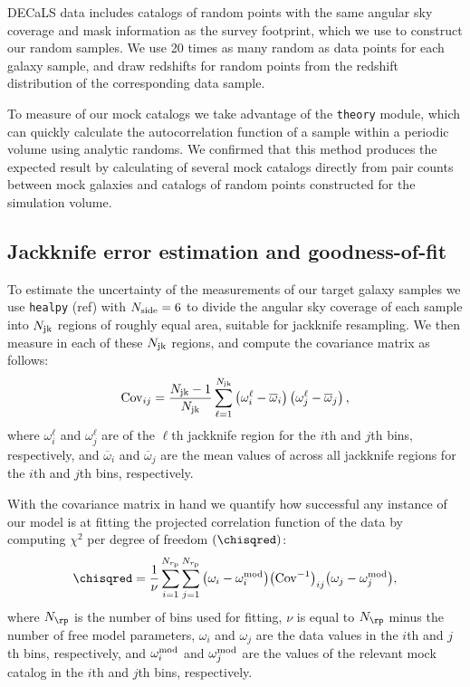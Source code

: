 \documentclass[twocolumn,apj,iop,tighten]{emulateapj2}
\begin{document}
DECaLS data includes catalogs of random points with the same angular sky coverage and mask information as the survey footprint, which we use to construct our random samples. We use 20 times as many random as data points for each galaxy sample, and draw redshifts for random points from the redshift distribution of the corresponding data sample.

To measure \wprp of our mock catalogs we take advantage of the \corrfunc \texttt{theory} module, which can quickly calculate the autocorrelation function of a sample within a periodic volume using analytic randoms. We confirmed that this method produces the expected result by calculating \wprp of several mock catalogs directly from pair counts between mock galaxies and catalogs of random points constructed for the simulation volume.


\subsection{Jackknife error estimation and goodness-of-fit}\label{subsec:error}

To estimate the uncertainty of the \wprp measurements of our target galaxy samples we use \texttt{healpy} (ref) with $N_{\rm side}=6$ to divide the angular sky coverage of each sample into $N_{\rm jk}$ regions of roughly equal area, suitable for jackknife resampling. We then measure \wprp in each of these $N_{\rm jk}$ regions, and compute the covariance matrix as follows:
\begin{equation}\label{eq:cov}
{\rm Cov}_{ij} = \frac{N_{\rm jk}-1}{N_{\rm jk}}
\sum^{N_{\rm jk}}_{\ell=1}\left(\omega^\ell_i-\overline{\omega}_i\right) \left(\omega^\ell_j-\overline{\omega}_j\right),
\end{equation}
%
\noindent where $\omega^\ell_i$ and $\omega^\ell_j$ are \wprp of the $\ell$th jackknife region for the $i$th and $j$th \rp bins, respectively, and $\overline{\omega}_i$ and $\overline{\omega}_j$ are the mean values of \wprp across all jackknife regions for the $i$th and $j$th \rp bins, respectively.

With the covariance matrix in hand we quantify how successful any instance of our model is at fitting the projected correlation function of the data by computing $\chi^2$ per degree of freedom $(\chisqred)$:
%
\begin{equation}\label{eq:chisq}
\chisqred=\frac{1}{\nu}\sum_{i=1}^{N_{r_{\rm p}}}
\sum_{j=1}^{N_{r_{\rm p}}}\left(\omega_i-\omega^{\rm mod}_i\right)
\!\left({\rm Cov}^{-1}\right)_{ij}\!\left(\omega_j-\omega^{\rm mod}_j\right)\!,
\end{equation}
%
\noindent where $N_{\rp}$ is the number of \rp bins used for fitting, $\nu$ is equal to $N_{\rp}$ minus the number of free model parameters, $\omega_i$ and $\omega_j$ are the data \wprp values in the $i$th and $j$th \rp bins, respectively, and $\omega^{\rm mod}_i$ and $\omega^{\rm mod}_j$ are the \wprp values of the relevant mock catalog in the $i$th and $j$th \rp bins, respectively.
\end{document}
